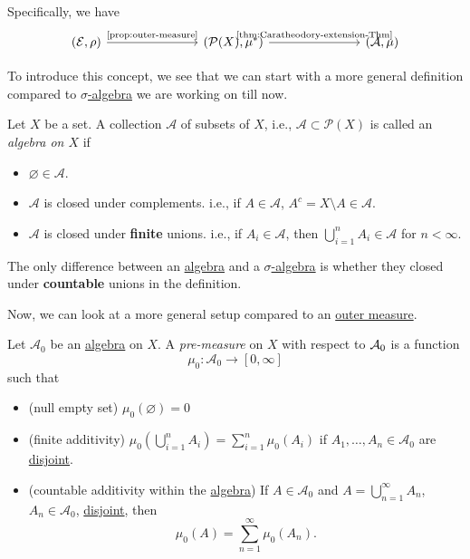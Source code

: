 Specifically, we have
\[
	\begin{tikzcd}
		(\mathcal{E}, \rho) \ar[rrr, "\text{\autoref{prop:outer-measure}}"] &&& (\mathcal{P}(X), \mu^{\ast} ) \ar[rrr, "\text{\autoref{thm:Caratheodory-extension-Thm}}"] &&& (\mathcal{A} , \mu)
	\end{tikzcd}
\]

\par To introduce this concept, we see that we can start with a more general definition compared to \hyperref[def:sigma-algebra]{\(\sigma\)-algebra} we are working on till now.
\begin{definition}[Algebra]\label{def:algebra}
	Let \(X\) be a set. A collection \(\mathcal{A} \) of subsets of \(X\), i.e., \(\mathcal{A}\subset \mathcal{P} (X) \) is called an \emph{algebra on \(X\)} if
	\begin{itemize}
		\item \(\varnothing \in \mathcal{A} \).
		\item \(\mathcal{A} \) is closed under complements. i.e., if \(A\in \mathcal{A} \), \(A^c = X\setminus A\in \mathcal{A} \).
		\item \(\mathcal{A} \) is closed under \textbf{finite} unions. i.e., if \(A_i\in \mathcal{A} \), then \(\bigcup\limits_{i=1}^{n} A_{i}\in \mathcal{A} \) for \(n<\infty \).
	\end{itemize}
\end{definition}
\begin{remark}
	The only difference between an \hyperref[def:algebra]{algebra} and a \hyperref[def:sigma-algebra]{\(\sigma\)-algebra} is whether they closed under \textbf{countable} unions in the definition.
\end{remark}

\par Now, we can look at a more general setup compared to an \hyperref[def:outer-measure]{outer measure}.
\begin{definition}\label{def:pre-measure}
	Let \(\mathcal{A} _0\) be an \hyperref[def:algebra]{algebra} on \(X\). A \emph{pre-measure} on \(X\) with respect to \(\mathcal{\MakeUppercase{a}} _0\) is a function
	\[
		\mu_0 \colon \mathcal{A} _0\to [0, \infty ]
	\]
	such that
	\begin{itemize}
		\item\label{def:pre-measure-null-empty-set}(null empty set) \(\mu_0(\varnothing ) = 0\)
		\item\label{def:pre-measure-finite-additivity}(finite additivity) \(\mu_0\left(\bigcup\limits_{i=1}^{n} A_{i}\right) = \sum\limits_{i=1}^{n} \mu_0(A_{i})\) if
		\(A_1, \ldots , A_n\in \mathcal{A} _0 \) are \underline{disjoint}.
		\item\label{def:pre-measure-countable-additivity-within-the-algebra}(countable additivity within the \hyperref[def:algebra]{algebra}) If \(A\in\mathcal{A} _0\) and \(A = \bigcup\limits_{n=1}^{\infty} A_{n}\),
		\(A_n\in\mathcal{A} _0\), \underline{disjoint}, then
		\[
			\mu_0(A) = \sum\limits_{n=1}^{\infty} \mu_0(A_{n}).
		\]
	\end{itemize}
\end{definition}

